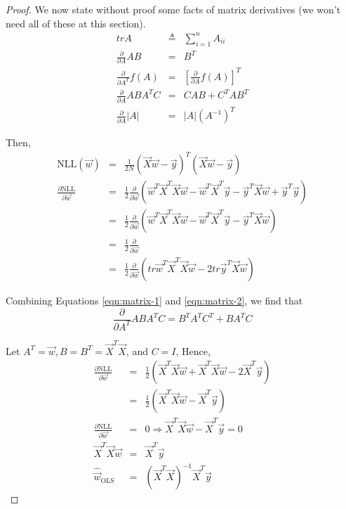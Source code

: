 \begin{proof}
We now state without proof some facts of matrix derivatives (we won’t need all of these at this section).
\begin{eqnarray}
trA &\triangleq& \sum\limits_{i=1}^n A_{ii} \nonumber \\
\frac{\partial}{\partial A}AB &=& B^T \\
\frac{\partial}{\partial A^T}f(A) &=& \left[\frac{\partial}{\partial A}f(A)\right]^T \label{eqn:matrix-1} \\
\frac{\partial}{\partial A}ABA^TC &=& CAB+C^TAB^T \label{eqn:matrix-2} \\
\frac{\partial}{\partial A}|A| &=& |A|(A^{-1})^T
\end{eqnarray}

Then,
\begin{eqnarray*}
\text{NLL}(\vec{w}) &=& \frac{1}{2N}(\vec{X}\vec{w}-\vec{y})^T(\vec{X}\vec{w}-\vec{y}) \\
\frac{\partial \text{NLL}}{\partial\vec{w}} 
&=& \frac{1}{2} \frac{\partial}{\partial\vec{w}} (\vec{w}^T\vec{X}^T\vec{X}\vec{w}-\vec{w}^T\vec{X}^T\vec{y}-\vec{y}^T\vec{X}\vec{w}+\vec{y}^T\vec{y}) \\
&=& \frac{1}{2} \frac{\partial}{\partial\vec{w}} (\vec{w}^T\vec{X}^T\vec{X}\vec{w}-\vec{w}^T\vec{X}^T\vec{y}-\vec{y}^T\vec{X}\vec{w}) \\
&=& \frac{1}{2} \frac{\partial}{\partial\vec{w}}  \\
&=& \frac{1}{2} \frac{\partial}{\partial\vec{w}} (tr\vec{w}^T\vec{X}^T\vec{X}\vec{w}-2tr\vec{y}^T\vec{X}\vec{w})
\end{eqnarray*}

Combining Equations \ref{eqn:matrix-1} and \ref{eqn:matrix-2}, we find that 
\begin{equation*}
\frac{\partial}{\partial A^T}ABA^TC = B^TA^TC^T+BA^TC
\end{equation*}

Let $A^T=\vec{w}, B=B^T=\vec{X}^T\vec{X}$, and $C=I$, Hence,
\begin{eqnarray}
\frac{\partial \text{NLL}}{\partial\vec{w}} &=& \frac{1}{2} (\vec{X}^T\vec{X}\vec{w}+\vec{X}^T\vec{X}\vec{w} -2\vec{X}^T\vec{y}) \nonumber \\
						   &=& \frac{1}{2} (\vec{X}^T\vec{X}\vec{w} - \vec{X}^T\vec{y}) \nonumber \\
\frac{\partial \text{NLL}}{\partial\vec{w}} &=& 0 \Rightarrow \vec{X}^T\vec{X}\vec{w} - \vec{X}^T\vec{y} =0 \nonumber \\
\vec{X}^T\vec{X}\vec{w} &=& \vec{X}^T\vec{y} \label{eqn:normal-equation} \\
\hat{\vec{w}}_{\mathrm{OLS}} &=& (\vec{X}^T\vec{X})^{-1}\vec{X}^T\vec{y} \nonumber
\end{eqnarray}
\end{proof}
